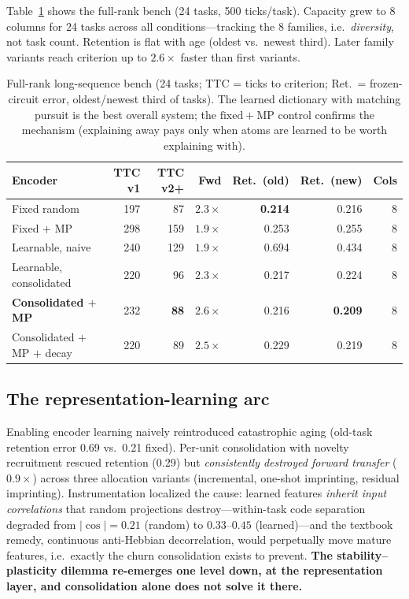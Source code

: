 \documentclass[11pt]{article}
\begin{document}
Table~\ref{tab:longbench} shows the full-rank bench (24 tasks, 500
ticks/task). Capacity grew to 8 columns for 24 tasks across all
conditions---tracking the 8 families, i.e.\ \emph{diversity}, not task
count. Retention is flat with age (oldest vs.\ newest third). Later family
variants reach criterion up to $2.6\times$ faster than first variants.

\begin{table}[ht]
\centering\small
\begin{tabular}{lrrrrrr}
\toprule
Encoder & TTC v1 & TTC v2+ & Fwd & Ret.\ (old) & Ret.\ (new) & Cols\\
\midrule
Fixed random               & 197 & 87  & $2.3\times$ & \textbf{0.214} & 0.216 & 8\\
Fixed $+$ MP               & 298 & 159 & $1.9\times$ & 0.253 & 0.255 & 8\\
Learnable, naive           & 240 & 129 & $1.9\times$ & 0.694 & 0.434 & 8\\
Learnable, consolidated    & 220 & 96  & $2.3\times$ & 0.217 & 0.224 & 8\\
\textbf{Consolidated $+$ MP} & 232 & \textbf{88} & $\mathbf{2.6\times}$ & 0.216 & \textbf{0.209} & 8\\
Consolidated $+$ MP $+$ decay & 220 & 89 & $2.5\times$ & 0.229 & 0.219 & 8\\
\bottomrule
\end{tabular}
\caption{Full-rank long-sequence bench (24 tasks; TTC = ticks to criterion;
Ret.\ = frozen-circuit error, oldest/newest third of tasks). The learned
dictionary with matching pursuit is the best overall system; the
$\mathrm{fixed}+\mathrm{MP}$ control confirms the mechanism (explaining
away pays only when atoms are learned to be worth explaining with).}
\label{tab:longbench}
\end{table}

\subsection{The representation-learning arc}
\label{sec:encoderarc}

Enabling encoder learning naively reintroduced catastrophic aging
(old-task retention error 0.69 vs.\ 0.21 fixed). Per-unit consolidation
with novelty recruitment rescued retention (0.29) but \emph{consistently
destroyed forward transfer} ($0.9\times$) across three allocation variants
(incremental, one-shot imprinting, residual imprinting). Instrumentation
localized the cause: learned features \emph{inherit input correlations}
that random projections destroy---within-task code separation degraded from
$|\!\cos\!| = 0.21$ (random) to $0.33$--$0.45$ (learned)---and the textbook
remedy, continuous anti-Hebbian decorrelation, would perpetually move
mature features, i.e.\ exactly the churn consolidation exists to prevent.
\textbf{The stability--plasticity dilemma re-emerges one level down, at the
representation layer, and consolidation alone does not solve it there.}
\end{document}

